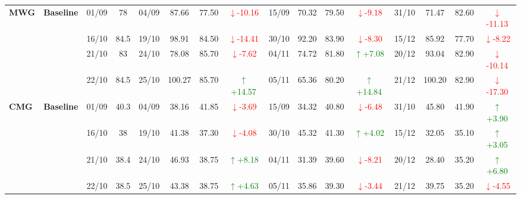 \documentclass{ieeeaccess}
\begin{document}
{\begin{longtable}{llcc|cccc|cccc|cccc}
\multirow{4}{*}{\textbf{MWG}}
& \textbf{Baseline}
& 01/09 & 78 & 04/09 & 87.66 & 77.50 & \textcolor{red}{\(\downarrow\)-10.16} & 15/09 & 70.32 & 79.50 & \textcolor{red}{\(\downarrow\)-9.18} & 31/10 & 71.47 & 82.60 & \textcolor{red}{\(\downarrow\)-11.13} \\
& & 16/10 & 84.5 & 19/10 & 98.91 & 84.50 & \textcolor{red}{\(\downarrow\)-14.41} & 30/10 & 92.20 & 83.90 & \textcolor{red}{\(\downarrow\)-8.30} & 15/12 & 85.92 & 77.70 & \textcolor{red}{\(\downarrow\)-8.22} \\
& & 21/10 & 83 & 24/10 & 78.08 & 85.70 & \textcolor{red}{\(\downarrow\)-7.62} & 04/11 & 74.72 & 81.80 & \textcolor{green}{\(\uparrow\)+7.08} & 20/12 & 93.04 & 82.90 & \textcolor{red}{\(\downarrow\)-10.14} \\
& & 22/10 & 84.5 & 25/10 & 100.27 & 85.70 & \textcolor{green}{\(\uparrow\)+14.57} & 05/11 & 65.36 & 80.20 & \textcolor{green}{\(\uparrow\)+14.84} & 21/12 & 100.20 & 82.90 & \textcolor{red}{\(\downarrow\)-17.30} \\
\midrule

\multirow{4}{*}{\textbf{CMG}}
& \textbf{Baseline}
& 01/09 & 40.3 & 04/09 & 38.16 & 41.85 & \textcolor{red}{\(\downarrow\)-3.69} & 15/09 & 34.32 & 40.80 & \textcolor{red}{\(\downarrow\)-6.48} & 31/10 & 45.80 & 41.90 & \textcolor{green}{\(\uparrow\)+3.90} \\
& & 16/10 & 38 & 19/10 & 41.38 & 37.30 & \textcolor{red}{\(\downarrow\)-4.08} & 30/10 & 45.32 & 41.30 & \textcolor{green}{\(\uparrow\)+4.02} & 15/12 & 32.05 & 35.10 & \textcolor{green}{\(\uparrow\)+3.05} \\
& & 21/10 & 38.4 & 24/10 & 46.93 & 38.75 & \textcolor{green}{\(\uparrow\)+8.18} & 04/11 & 31.39 & 39.60 & \textcolor{red}{\(\downarrow\)-8.21} & 20/12 & 28.40 & 35.20 & \textcolor{green}{\(\uparrow\)+6.80} \\
& & 22/10 & 38.5 & 25/10 & 43.38 & 38.75 & \textcolor{green}{\(\uparrow\)+4.63} & 05/11 & 35.86 & 39.30 & \textcolor{red}{\(\downarrow\)-3.44} & 21/12 & 39.75 & 35.20 & \textcolor{red}{\(\downarrow\)-4.55} \\
\midrule


\end{longtable}}
\end{document}
